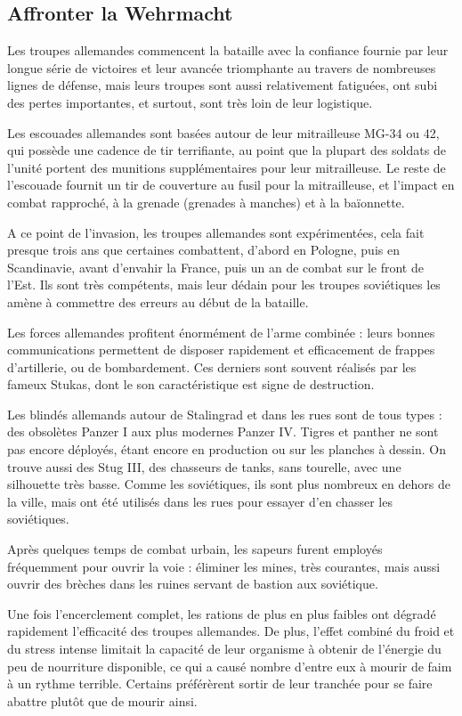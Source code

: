 \documentclass{report}
\begin{document}
\begin{multicols}{2}
\subsection{Affronter la Wehrmacht}
Les troupes allemandes commencent la bataille avec la confiance fournie par leur longue série de victoires et leur avancée triomphante au travers de nombreuses lignes de défense, mais leurs troupes sont aussi relativement fatiguées, ont subi des pertes importantes, et surtout, sont très loin de leur logistique.

Les escouades allemandes sont basées autour de leur mitrailleuse MG-34 ou 42, qui possède une cadence de tir terrifiante, au point que la plupart des soldats de l'unité portent des munitions supplémentaires pour leur mitrailleuse. Le reste de l'escouade fournit un tir de couverture au fusil pour la mitrailleuse, et l'impact en combat rapproché, à la grenade (grenades à manches) et à la baïonnette.

A ce point de l'invasion, les troupes allemandes sont expérimentées, cela fait presque trois ans que certaines combattent, d'abord en Pologne, puis en Scandinavie, avant d'envahir la France, puis un an de combat sur le front de l'Est. Ils sont très compétents, mais leur dédain pour les troupes soviétiques les amène à commettre des erreurs au début de la bataille. 

Les forces allemandes profitent énormément de l'arme combinée : leurs bonnes communications permettent de disposer rapidement et efficacement de frappes d'artillerie, ou de bombardement. Ces derniers sont souvent réalisés par les fameux Stukas, dont le son caractéristique est signe de destruction.

Les blindés allemands autour de Stalingrad et dans les rues sont de tous types : des obsolètes Panzer I aux plus modernes Panzer IV. Tigres et panther ne sont pas encore déployés, étant encore en production ou sur les planches à dessin. On trouve aussi des Stug III, des chasseurs de tanks, sans tourelle, avec une silhouette très basse. Comme les soviétiques, ils sont plus nombreux en dehors de la ville, mais ont été utilisés dans les rues pour essayer d'en chasser les soviétiques.

Après quelques temps de combat urbain, les sapeurs furent employés fréquemment pour ouvrir la voie : éliminer les mines, très courantes, mais aussi ouvrir des brèches dans les ruines servant de bastion aux soviétique.

Une fois l'encerclement complet, les rations de plus en plus faibles ont dégradé rapidement l'efficacité des troupes allemandes. De plus, l'effet combiné du froid et du stress intense limitait la capacité de leur organisme à obtenir de l'énergie du peu de nourriture disponible, ce qui a causé nombre d'entre eux à mourir de faim à un rythme terrible. Certains préférèrent sortir de leur tranchée pour se faire abattre plutôt que de mourir ainsi.

\end{multicols}
\end{document}
